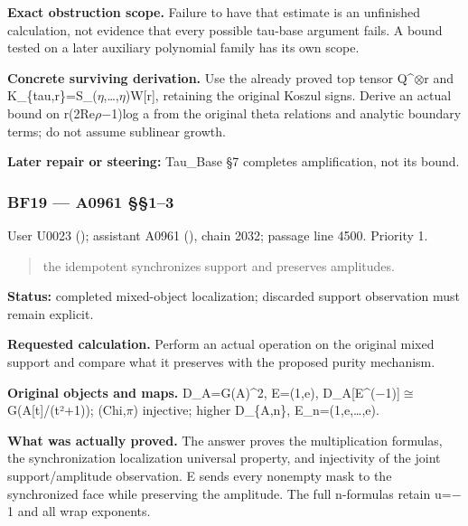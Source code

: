 \textbf{Exact obstruction scope.} Failure to have that estimate is an
unfinished calculation, not evidence that every possible tau-base
argument fails. A bound tested on a later auxiliary polynomial family
has its own scope.

\textbf{Concrete surviving derivation.} Use the already proved top
tensor Q\textasciicircum{}\allowbreak{}\ensuremath{⊗}\allowbreak{}r and
K\_\{tau,r\}=S\_(\allowbreak{}\ensuremath{η}\allowbreak{},…,\allowbreak{}\ensuremath{η}\allowbreak{})W[r],
retaining the original Koszul signs. Derive an actual bound on
r(2Re\allowbreak{}\ensuremath{ρ}\allowbreak{}\allowbreak{}\ensuremath{−}\allowbreak{}1)log
a from the original theta relations and analytic boundary terms; do not
assume sublinear growth.

\textbf{Later repair or steering:} Tau\_Base §7 completes amplification,
not its bound.

\subsubsection{BF19 --- A0961 §§1--3}\label{TranscriptLedgerStage:bf19-a0961-13}

User U0023 (\protect{});
assistant A0961 (\protect{}),
chain 2032; passage line 4500. Priority 1.

\begin{quote}
the idempotent synchronizes support and preserves amplitudes.
\end{quote}

\textbf{Status:} completed mixed-object localization; discarded support
observation must remain explicit.

\textbf{Requested calculation.} Perform an actual operation on the
original mixed support and compare what it preserves with the proposed
purity mechanism.

\textbf{Original objects and maps.} D\_A=G(A)\^{}2, E=(1,e),
D\_A[E\textasciicircum{}(\allowbreak{}\ensuremath{−}\allowbreak{}1)]\allowbreak{}\ensuremath{≅}\allowbreak{}G(A[t]/(t²+1));
(Chi,\allowbreak{}\ensuremath{π}\allowbreak{}) injective; higher
D\_\{A,n\}, E\_n=(1,e,\ldots,e).

\textbf{What was actually proved.} The answer proves the multiplication
formulas, the synchronization localization universal property, and
injectivity of the joint support/amplitude observation. E sends every
nonempty mask to the synchronized face while preserving the amplitude.
The full n-formulas retain u=\allowbreak{}\ensuremath{−}\allowbreak{}1
and all wrap exponents.

